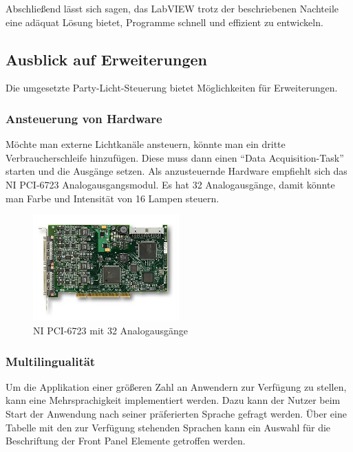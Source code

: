 Abschließend lässt sich sagen, das LabVIEW trotz der beschriebenen Nachteile eine adäquat Lösung bietet, Programme schnell und effizient zu entwickeln. %


	
\subsection{Ausblick auf Erweiterungen}
Die umgesetzte Party-Licht-Steuerung bietet Möglichkeiten für Erweiterungen.

\subsubsection{Ansteuerung von Hardware}
Möchte man externe Lichtkanäle ansteuern, könnte man ein dritte Verbraucherschleife hinzufügen. 
Diese muss dann einen "`Data Acquisition-Task"' starten und die Ausgänge setzen. 
Als anzusteuernde Hardware empfiehlt sich das NI PCI-6723 Analogausgangsmodul. 
Es hat 32 Analogausgänge, damit könnte man  Farbe und Intensität von 16 Lampen steuern.\cite{ni-pci}

	\begin{figure}[h!]
	\centering
		\includegraphics[width=0.5\textwidth]{Pics/pci6723.jpg}
	\caption{NI PCI-6723 mit 32 Analogausgänge \cite{ni-pci} }
	\label{fig:a7}
	\end{figure}




\subsubsection{Multilingualität}
Um die Applikation einer größeren Zahl an Anwendern zur Verfügung zu stellen, kann eine Mehrsprachigkeit implementiert werden. 
Dazu kann der Nutzer beim Start der Anwendung  nach seiner präferierten Sprache gefragt werden. Über eine Tabelle mit den zur Verfügung stehenden Sprachen kann
ein Auswahl für die Beschriftung der Front Panel Elemente getroffen werden.




